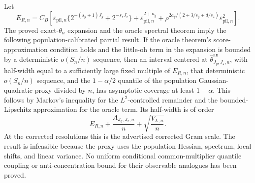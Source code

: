 Let
\[
E_{R,n}=C_B\left[
\varepsilon_{\mathrm{pil},n}\{2^{-(s_y+1)J_y}+2^{-s_zJ_z}\}
+\varepsilon_{\mathrm{pil},n}^{2+a_y}
+\rho^{2a_y/(2+3/s_y+d/s_z)}\varepsilon_{\mathrm{pil},n}^2
\right].
\]
The proved exact-\(\theta_n\) expansion and the oracle spectral theorem imply the following population-calibrated partial result.  If the oracle theorem's score-approximation condition holds and the little-oh term in the expansion is bounded by a deterministic \(o(S_n/n)\) sequence, then an interval centered at \(\widehat\theta^{\mathrm{an}}_{J_y,J_z,n}\), with half-width equal to a sufficiently large fixed multiple of \(E_{R,n}\), that deterministic \(o(S_n/n)\) sequence, and the \(1-\alpha/2\) quantile of the population Gaussian-quadratic proxy divided by \(n\), has asymptotic coverage at least \(1-\alpha\).  This follows by Markov's inequality for the \(L^2\)-controlled remainder and the bounded-Lipschitz approximation for the oracle term.  Its half-width is of order
\[
E_{R,n}+\frac{A_{J_y,J_z,n}}n+\sqrt{\frac{V_{L,n}}n}.
\]
At the corrected resolutions this is the advertised corrected Gram scale.  The result is infeasible because the proxy uses the population Hessian, spectrum, local shifts, and linear variance.  No uniform conditional common-multiplier quantile coupling or anti-concentration bound for their observable analogues has been proved.